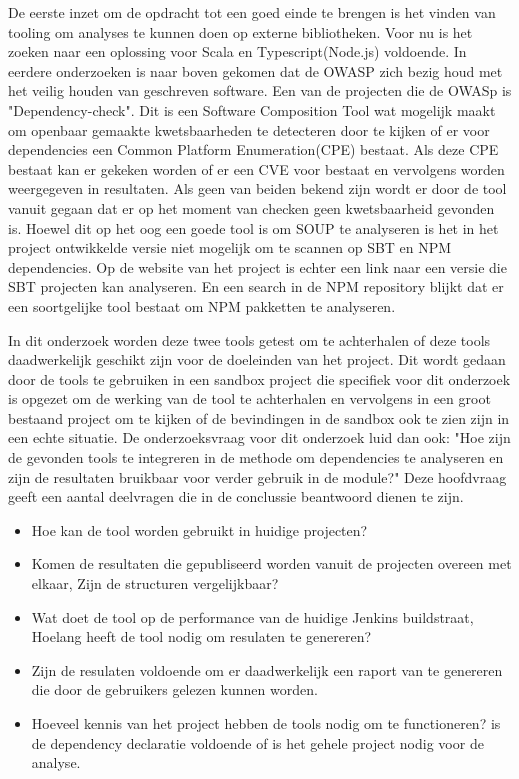 De eerste inzet om de opdracht tot een goed einde te brengen is het vinden van tooling om analyses te kunnen doen op externe bibliotheken. Voor nu is het zoeken naar een oplossing voor Scala en Typescript(Node.js) voldoende. In eerdere onderzoeken is naar boven gekomen dat de OWASP zich bezig houd met het veilig houden van geschreven software. Een van de projecten die de OWASp is "Dependency-check". Dit is een Software Composition Tool wat mogelijk maakt om openbaar gemaakte kwetsbaarheden te detecteren door te kijken of er voor dependencies een Common Platform Enumeration(CPE) bestaat. Als deze CPE bestaat kan er gekeken worden of er een CVE voor bestaat en vervolgens worden weergegeven in resultaten. Als geen van beiden bekend zijn wordt er door de tool vanuit gegaan dat er op het moment van checken geen kwetsbaarheid gevonden is. Hoewel dit op het oog een goede tool is om SOUP te analyseren is het in het project ontwikkelde versie niet mogelijk om te scannen op SBT en NPM dependencies. Op de website van het project is echter een link naar een versie die SBT projecten kan analyseren. En een search in de NPM repository blijkt dat er een soortgelijke tool bestaat om NPM pakketten te analyseren.


In dit onderzoek worden deze twee tools getest om te achterhalen of deze tools daadwerkelijk geschikt zijn voor de doeleinden van het project. Dit wordt gedaan door de tools te gebruiken in een sandbox project die specifiek voor dit onderzoek is opgezet om de werking van de tool te achterhalen en vervolgens in een groot bestaand project om te kijken of de bevindingen in de sandbox ook te zien zijn in een echte situatie.
De onderzoeksvraag voor dit onderzoek luid dan ook: "Hoe zijn de gevonden tools te integreren in de methode om dependencies te analyseren en zijn de resultaten bruikbaar voor verder gebruik in de module?" Deze hoofdvraag geeft een aantal deelvragen die in de conclussie beantwoord dienen te zijn.
\begin{itemize}
    \item Hoe kan de tool worden gebruikt in huidige projecten?
    \item Komen de resultaten die gepubliseerd worden vanuit de projecten overeen met elkaar, Zijn de structuren vergelijkbaar?
    \item Wat doet de tool op de performance van de huidige Jenkins buildstraat, Hoelang heeft de tool nodig om resulaten te genereren?
    \item Zijn de resulaten voldoende om er daadwerkelijk een raport van te genereren die door de gebruikers gelezen kunnen worden.
    \item Hoeveel kennis van het project hebben de tools nodig om te functioneren? is de dependency declaratie voldoende of is het gehele project nodig voor de analyse.
\end{itemize}


